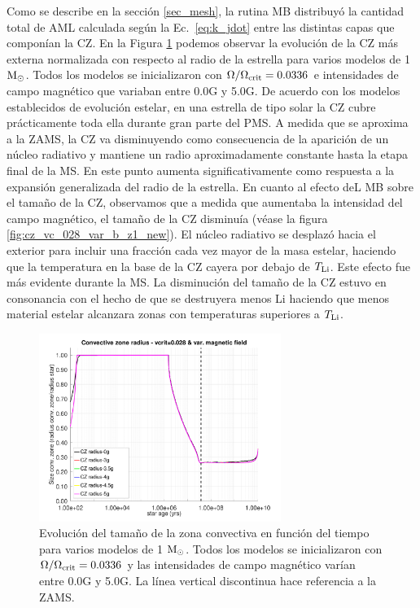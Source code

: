 Como se describe en la sección \ref{sec_mesh}, la rutina MB distribuyó la cantidad total de AML calculada según la Ec.~\ref{eq:k_jdot} entre las distintas capas que componían la CZ. En la Figura \ref{fig:cz_vc_028_var_b} podemos observar la evolución de la CZ más externa normalizada con respecto al radio de la estrella para varios modelos de 1 $\mathrm{M}_\odot$. Todos los modelos se inicializaron con $\Omega / \Omega_{\mathrm{crit}}=0.0336$ e intensidades de campo magnético que variaban entre 0.0G y 5.0G. De acuerdo con los modelos establecidos de evolución estelar, en una estrella de tipo solar la CZ cubre prácticamente toda ella durante gran parte del PMS. A medida que se aproxima a la ZAMS, la CZ va disminuyendo como consecuencia de la aparición de un núcleo radiativo y mantiene un radio aproximadamente constante hasta la etapa final de la MS. En este punto aumenta significativamente como respuesta a la expansión generalizada del radio de la estrella. En cuanto al efecto deL MB sobre el tamaño de la CZ, observamos que a medida que aumentaba la intensidad del campo magnético, el tamaño de la CZ disminuía (véase la figura \ref{fig:cz_vc_028_var_b_z1_new}). El núcleo radiativo se desplazó hacia el exterior para incluir una fracción cada vez mayor de la masa estelar, haciendo que la temperatura en la base de la CZ cayera por debajo de $T_{\mathrm{Li}}$. Este efecto fue más evidente durante la MS. La disminución del tamaño de la CZ estuvo en consonancia con el hecho de que se destruyera menos Li haciendo que menos material estelar alcanzara zonas con temperaturas superiores a $T_{\mathrm{Li}}$.\par

\begin{figure}
    \centering
    \includegraphics[width=0.7\textwidth]{img/paper1/cz_vc_028_var_g.pdf}
	\caption{Evolución del tamaño de la zona convectiva en función del tiempo para varios modelos de 1 $\mathrm{M}_\odot$. Todos los modelos se inicializaron con $\Omega / \Omega_{\mathrm{crit}}=0.0336$ y las intensidades de campo magnético varían entre 0.0G y 5.0G. La línea vertical discontinua hace referencia a la ZAMS.}
	\label{fig:cz_vc_028_var_b}
\end{figure}

